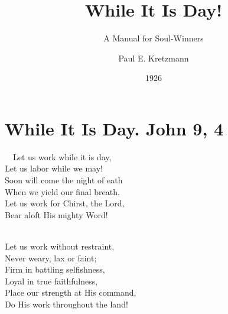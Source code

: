 \documentclass[
]{book}
\title{While It Is Day!}
\subtitle{A Manual for Soul-Winners}
\author{Paul E. Kretzmann}
\date{1926}
\begin{document}
\maketitle

{
\setcounter{tocdepth}{1}
\tableofcontents
}
\hypertarget{while-it-is-day.-john-9-4}{%
\chapter*{While It Is Day. John 9, 4}\label{while-it-is-day.-john-9-4}}

~~Let us work while it is day,\\
\hspace*{0.333em}\hspace*{0.333em}Let us labor while we may!\\
\hspace*{0.333em}\hspace*{0.333em}Soon will come the night of eath\\
\hspace*{0.333em}\hspace*{0.333em}When we yield our final breath.\\
\hspace*{0.333em}\hspace*{0.333em}Let us work for Chirst, the Lord,\\
\hspace*{0.333em}\hspace*{0.333em}Bear aloft His mighty Word!\\
\strut \\
\hspace*{0.333em}\hspace*{0.333em}Let us work without restraint,\\
\hspace*{0.333em}\hspace*{0.333em}Never weary, lax or faint;\\
\hspace*{0.333em}\hspace*{0.333em}Firm in battling selfishness,\\
\hspace*{0.333em}\hspace*{0.333em}Loyal in true faithfulness,\\
\hspace*{0.333em}\hspace*{0.333em}Place our strength at His command,\\
\hspace*{0.333em}\hspace*{0.333em}Do His work throughout the land!\\
\end{document}
